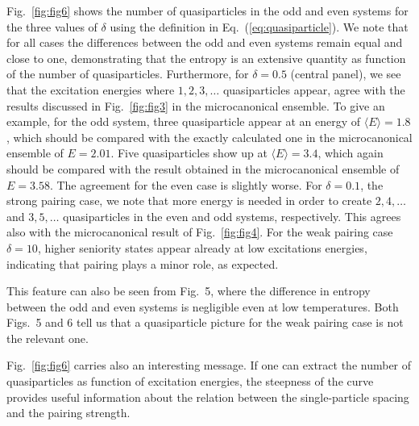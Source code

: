 Fig.\ \ref{fig:fig6} shows the number of quasiparticles in the odd and even systems for the three values of $\delta$ using the definition in Eq.\ (\ref{eq:quasiparticle}). We note that for all cases the differences between the odd and even systems remain equal and close to one, demonstrating that the entropy is an extensive quantity as function of the number of quasiparticles. Furthermore, for $\delta=0.5$ (central panel), we see that the excitation energies where $1,2,3,\dots$ quasiparticles appear, agree with the results discussed in Fig.\ \ref{fig:fig3} in the microcanonical ensemble. To give an example, for the odd system, three quasiparticle appear at an energy of $\langle E\rangle =1.8$, which should be compared with the exactly calculated one in the microcanonical ensemble of $E=2.01$. Five quasiparticles show up at $\langle E\rangle =3.4$, which again should be compared with the result obtained in the microcanonical ensemble of $E=3.58$. The agreement for the even case is slightly worse. For $\delta=0.1$, the strong pairing case, we note that more energy is needed in order to create $2,4,\dots$ and $3,5,\dots$ quasiparticles in the even and odd systems, respectively. This agrees also with the microcanonical result of Fig.\ \ref{fig:fig4}. For the weak pairing case $\delta=10$, higher seniority states appear already at low excitations energies, indicating that pairing plays a minor role, as expected. 

This feature can also be seen from Fig.~5, where the difference
in entropy between the odd and even systems is negligible even at low
temperatures. Both Figs.~5 and 6 tell us that a quasiparticle picture
for the weak pairing case is not the relevant one.  

Fig.\ \ref{fig:fig6} carries also an interesting message. If one can extract the number of quasiparticles as function of excitation energies, the steepness of the curve provides useful information about the relation between the single-particle spacing and the pairing strength. 

